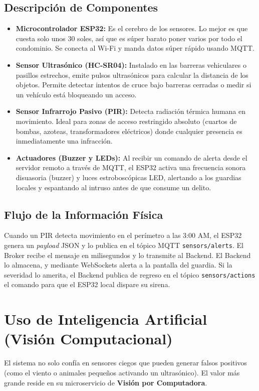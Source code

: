 \documentclass[12pt,a4paper]{article}
\begin{document}
\subsection{Descripción de Componentes}
\begin{itemize}
    \item \textbf{Microcontrolador ESP32:} Es el cerebro de los sensores. Lo mejor es que cuesta solo unos 30 soles, así que es súper barato poner varios por todo el condominio. Se conecta al Wi-Fi y manda datos súper rápido usando MQTT.
    \item \textbf{Sensor Ultrasónico (HC-SR04):} Instalado en las barreras vehiculares o pasillos estrechos, emite pulsos ultrasónicos para calcular la distancia de los objetos. Permite detectar intentos de cruce bajo barreras cerradas o medir si un vehículo está bloqueando un acceso.
    \item \textbf{Sensor Infrarrojo Pasivo (PIR):} Detecta radiación térmica humana en movimiento. Ideal para zonas de acceso restringido absoluto (cuartos de bombas, azoteas, transformadores eléctricos) donde cualquier presencia es inmediatamente una infracción.
    \item \textbf{Actuadores (Buzzer y LEDs):} Al recibir un comando de alerta desde el servidor remoto a través de MQTT, el ESP32 activa una frecuencia sonora disuasoria (buzzer) y luces estroboscópicas LED, alertando a los guardias locales y espantando al intruso antes de que consume un delito.
\end{itemize}

\subsection{Flujo de la Información Física}
Cuando un PIR detecta movimiento en el perímetro a las 3:00 AM, el ESP32 genera un \textit{payload} JSON y lo publica en el tópico MQTT \texttt{sensors/alerts}. El Broker recibe el mensaje en milisegundos y lo transmite al Backend. El Backend lo almacena, y mediante WebSockets alerta a la pantalla del guardia. Si la severidad lo amerita, el Backend publica de regreso en el tópico \texttt{sensors/actions} el comando para que el ESP32 local dispare su sirena.

\section{Uso de Inteligencia Artificial (Visión Computacional)}
El sistema no solo confía en sensores ciegos que pueden generar falsos positivos (como el viento o animales pequeños activando un ultrasónico). El valor más grande reside en su microservicio de \textbf{Visión por Computadora}.
\end{document}

